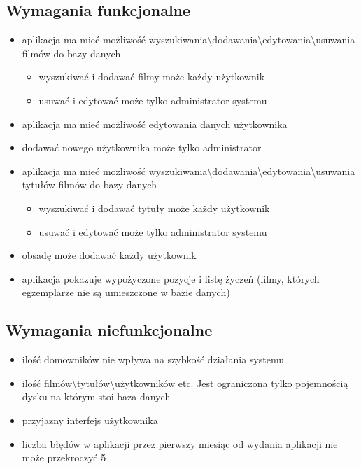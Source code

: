 \documentclass{article}
\begin{document}
	\subsection{Wymagania funkcjonalne}
	\begin{itemize}
	\item aplikacja ma mieć możliwość wyszukiwania\textbackslash dodawania\textbackslash edytowania\textbackslash usuwania filmów do bazy danych
	\begin{itemize}
		\item wyszukiwać i dodawać filmy może każdy użytkownik
		\item usuwać i edytować może tylko administrator systemu
	\end{itemize}
	\item aplikacja ma mieć możliwość edytowania danych użytkownika
	\item  dodawać nowego użytkownika może tylko administrator
	\item aplikacja ma mieć możliwość wyszukiwania\textbackslash dodawania\textbackslash edytowania\textbackslash usuwania tytułów filmów do bazy danych 
	\begin{itemize}
		\item wyszukiwać i dodawać tytuły może każdy użytkownik
		\item usuwać i edytować może tylko administrator systemu
	\end{itemize}
	\item obsadę może dodawać każdy użytkownik
	\item aplikacja pokazuje wypożyczone pozycje i listę życzeń (filmy, których egzemplarze nie są umieszczone w bazie danych)
	\end{itemize}
	\subsection{Wymagania niefunkcjonalne}	
	\begin{itemize}
		\item ilość domowników nie wpływa na szybkość działania systemu
		\item ilość filmów\textbackslash tytułów\textbackslash użytkowników etc. Jest ograniczona tylko pojemnością dysku na którym stoi baza danych
		\item przyjazny interfejs użytkownika
		\item liczba błędów w aplikacji przez pierwszy miesiąc od wydania aplikacji nie może przekroczyć 5		
	\end{itemize}
\newpage
\end{document}

